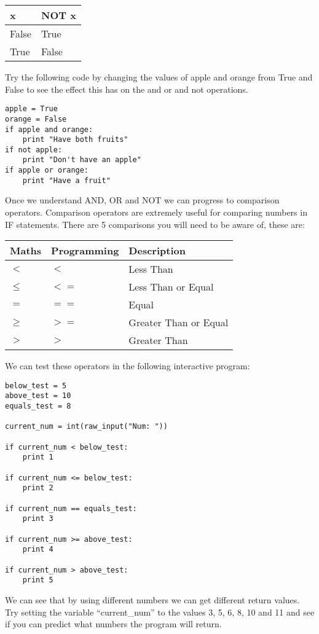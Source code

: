 \documentclass[twocolumn]{article}
\begin{document}
\begin{center}
\begin{tabular}{ll} 
		\toprule
		x & NOT x \\
		\midrule
		False & True \\
		True & False \\
		\bottomrule
	\end{tabular}
\end{center}
Try the following code by changing the values of apple and orange from True and False to see the effect this has on the and or and not operations.
\begin{lstlisting}
apple = True
orange = False
if apple and orange:
	print "Have both fruits"
if not apple:
	print "Don't have an apple"
if apple or orange:
	print "Have a fruit"
\end{lstlisting}
Once we understand AND, OR and NOT we can progress to comparison operators. Comparison operators are extremely useful for comparing numbers in IF statements. There are 5 comparisons you will need to be aware of, these are:
\begin{center}
	\begin{tabular}{lll} 
		\toprule
		Maths & Programming & Description\\
		\midrule
		$<$ & $<$ & Less Than\\
		$\le$ & $<=$ & Less Than or Equal\\
		$=$ & $==$ & Equal\\
		$\ge$ & $>=$ & Greater Than or Equal\\
		$>$ & $>$ & Greater Than\\
		\bottomrule
	\end{tabular}
\end{center}
We can test these operators in the following interactive program:
\begin{lstlisting}
below_test = 5
above_test = 10
equals_test = 8

current_num = int(raw_input("Num: "))

if current_num < below_test:
	print 1

if current_num <= below_test:
	print 2

if current_num == equals_test:
	print 3

if current_num >= above_test:
	print 4

if current_num > above_test:
	print 5
\end{lstlisting}
We can see that by using different numbers we can get different return values. Try setting the variable ``current\_num'' to the values 3, 5, 6, 8, 10 and 11 and see if you can predict what numbers the program will return.
\end{document}
